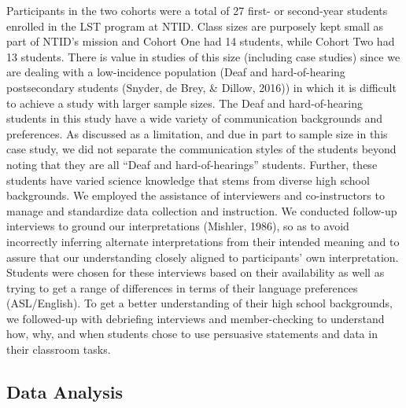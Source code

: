 \documentclass[11.5pt]{sig-alternate} %
\begin{document}
\begin{large}
Participants in the two cohorts were a total of 27 first- or second-year students enrolled in the LST program at NTID. Class sizes are purposely kept small as part of NTID’s mission and Cohort One had 14 students, while Cohort Two had 13 students. There is value in studies of this size (including case studies) since we are dealing with a low-incidence population (Deaf and hard-of-hearing postsecondary students (Snyder, de Brey, \& Dillow, 2016)) in which it is difficult to achieve a study with larger sample sizes. The Deaf and hard-of-hearing students in this study have a wide variety of communication backgrounds and preferences. As discussed as a limitation, and due in part to sample size in this case study, we did not separate the communication styles of the students beyond noting that they are all “Deaf and hard-of-hearings” students. Further, these students have varied science knowledge that stems from diverse high school backgrounds. We employed the assistance of interviewers and co-instructors to manage and standardize data collection and instruction. We conducted follow-up interviews to ground our interpretations (Mishler, 1986), so as to avoid incorrectly inferring alternate interpretations from their intended meaning and to assure that our understanding closely aligned to participants’ own interpretation. Students were chosen for these interviews based on their availability as well as trying to get a range of differences in terms of their language preferences (ASL/English). To get a better understanding of their high school backgrounds, we followed-up with debriefing interviews and member-checking to understand how, why, and when students chose to use persuasive statements and data in their classroom tasks. 

\subsection*{Data Analysis}


\end{large}
\end{document}
